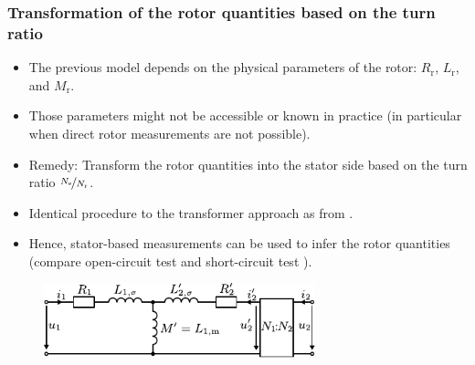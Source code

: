 \begin{frame}
	\frametitle{Transformation of the rotor quantities based on the turn ratio}
    \begin{itemize}
        \item<1-> The previous model depends on the physical parameters of the rotor:  $R_\mathrm{r}$, $L_\mathrm{r}$, and $M_\mathrm{r}$.
        \item<2-> Those parameters might not be accessible or known in practice (in particular when direct rotor measurements are not possible). \pause
        \item<3-> Remedy: Transform the rotor quantities into the stator side based on the turn ratio $\nicefrac{N_\mathrm{s}}{N_\mathrm{r}}$.
        \item<3-> Identical procedure to the transformer approach as from . 
        \item<4-> Hence, stator-based measurements can be used to infer the rotor quantities (compare open-circuit test  and short-circuit test ).
    \end{itemize}
    \begin{figure}
        \centering
        \includegraphics[width=0.7\textwidth]{fig/lec04/Transformer_T_ECD_turn_transf.pdf}
	\end{figure}	
\end{frame}

